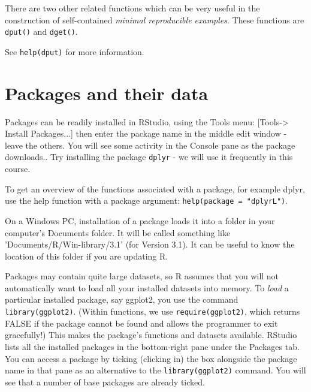 \documentclass[titlepage]{book}\usepackage{knitr}
\begin{document}
There are two other related functions which can be very useful in the construction of self-contained \emph{minimal reproducible examples}.  These functions are \texttt{dput()} and \texttt{dget()}.

\begin{knitrout}
\color{fgcolor}\begin{kframe}
\begin{alltt}
 \hlkwb{<-} 
 
 \hlkwb{<-} 
\end{alltt}
\end{kframe}
\end{knitrout}

See \texttt{help(dput)} for more information.


\section{Packages and their data}
Packages can be readily installed in RStudio, using the Tools menu: [Tools-> Install Packages...] then enter the package name in the middle edit window - leave the others. You will see some activity in the Console pane as the package downloads.. Try installing the package \texttt{dplyr} - we will use it frequently in this course.

To get an overview of the functions associated with a package, for example dplyr, use the help function with a package argument: \texttt{help(package = "dplyrL")}.

On a Windows PC, installation of a package loads it into a folder in your computer's Documents folder. It will be called something like 'Documents/R/Win-library/3.1' (for Version 3.1). It can be useful to know the location of this folder if you are updating R.

Packages may contain quite large datasets, so R assumes that you will not automatically want to load all your installed datasets into memory.  To \emph{load} a particular installed package, say ggplot2, you use the command \texttt{library(ggplot2)}. (Within functions, we use \texttt{require(ggplot2)}, which returns FALSE if the package cannot be found and allows the programmer to exit gracefully!) This makes the package's functions and datasets available. RStudio lists all the installed packages in the bottom-right pane under the Packages tab.  You can access a package by ticking (clicking in) the box alongside the package name in that pane as an alternative to the \texttt{library(ggplot2)} command. You will see that a number of base packages are already ticked.
\end{document}
